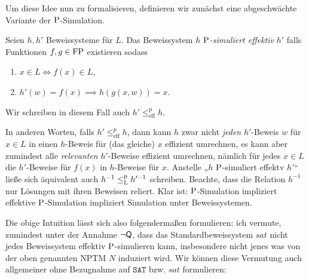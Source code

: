 Um diese Idee nun zu formalisieren, definieren wir zunächst eine abgeschwächte Variante der $\P$-Simulation.
\begin{definition}
    Seien $h,h'$ Beweissysteme für $L$. Das Beweissystem $h$ \emph{$\P$-simuliert effektiv} $h'$ falls Funktionen $f,g\in\FP$ existieren sodass
    \begin{enumerate}
        \item $x\in L \iff f(x)\in L$,
        \item $ h'(w)=f(x) \implies h(g(x, w)) = x. $
    \end{enumerate}
    Wir schreiben in diesem Fall auch $h'\leq^\mathrm p_\mathrm{eff} h$. %
\end{definition}
In anderen Worten, falls $h'\leq^p_\mathrm{eff} h$, dann kann $h$ zwar nicht \emph{jeden} $h'$-Beweis $w$ für $x\in L$ in einen $h$-Beweis für (das gleiche) $x$ effizient umrechnen, es kann aber zumindest alle \emph{relevanten} $h'$-Beweise effizient umrechnen, nämlich für jedes $x\in L$ die $h'$-Beweise für $f(x)$ in $h$-Beweise für $x$.
Anstelle „$h$ $\P$-simuliert effektv $h'$“ ließe sich äquivalent auch $h^{-1}\leqlp h'^{-1}$ schreiben. Beachte, dass die Relation $h^{-1}$ nur Lösungen mit ihren Beweisen reliert.
Klar ist: $\P$-Simulation impliziert effektive $\P$-Simulation impliziert Simulation unter Beweissystemen.

Die obige Intuition lässt sich also folgendermaßen formulieren: ich vermute, zumindest unter der Annahme $\neg\hQ$, dass das Standardbeweissystem $\mathit{sat}$ nicht jedes Beweissystem effektiv $\P$-simulieren kann, insbesondere nicht jenes was von der oben genannten NPTM $N$ induziert wird.
Wir können diese Vermutung auch allgemeiner ohne Bezugnahme auf $\mathtt{SAT}$ bzw. $\mathit{sat}$ formulieren:

